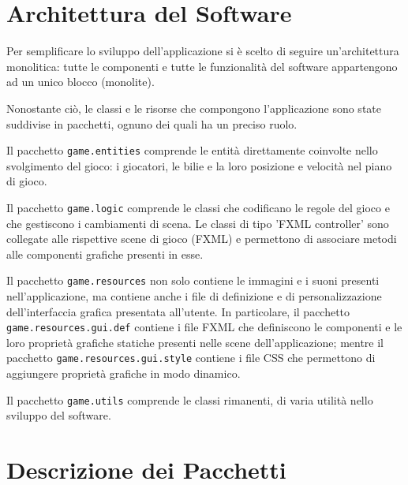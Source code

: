 \documentclass[12pt,a4paper]{report}
\begin{document}
\section{Architettura del Software}\label{se:Software Architecture} %

Per semplificare lo sviluppo dell'applicazione si è scelto di seguire un'architettura monolitica: tutte le componenti e tutte le funzionalità del software appartengono ad un unico blocco (monolite).

Nonostante ciò, le classi e le risorse che compongono l'applicazione sono state suddivise in pacchetti, ognuno dei quali ha un preciso ruolo.

\vspace{3mm}

Il pacchetto \texttt{game.entities} comprende le entità direttamente coinvolte nello svolgimento del gioco: i giocatori, le bilie e la loro posizione e velocità nel piano di gioco.

\vspace{3mm}

Il pacchetto \texttt{game.logic} comprende le classi che codificano le regole del gioco e che gestiscono i cambiamenti di scena.
Le classi di tipo 'FXML controller' sono collegate alle rispettive scene di gioco (FXML) e permettono di associare metodi alle componenti grafiche presenti in esse.

\vspace{3mm}

Il pacchetto \texttt{game.resources} non solo contiene le immagini e i suoni presenti nell'applicazione, ma contiene anche i file di definizione e di personalizzazione dell'interfaccia grafica presentata all'utente.
In particolare, il pacchetto \texttt{game.resources.gui.def} contiene i file FXML che definiscono le componenti e le loro proprietà grafiche statiche presenti nelle scene dell'applicazione; mentre il pacchetto \texttt{game.resources.gui.style} contiene i file CSS che permettono di aggiungere proprietà grafiche in modo dinamico.

\vspace{3mm}

Il pacchetto \texttt{game.utils} comprende le classi rimanenti, di varia utilità nello sviluppo del software.


\section{Descrizione dei Pacchetti}\label{se:Packages Description} %
\end{document}
